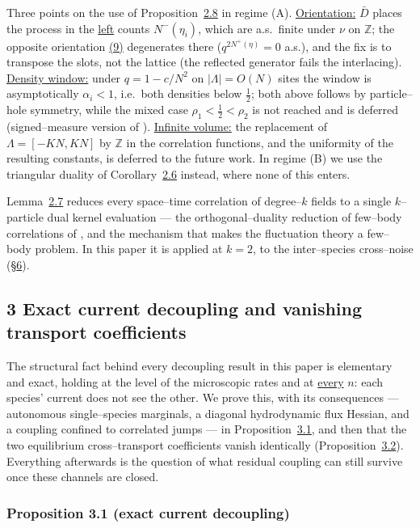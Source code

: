 \documentclass[11pt]{article}
\theoremstyle{plain}
\theoremstyle{definition}
\theoremstyle{remark}
\newcommand{\Z}{\mathbb{Z}}\newcommand{\R}{\mathbb{R}}\newcommand{\N}{\mathbb{N}}
\begin{document}
Three points on the use of Proposition~\hyperref[prop_orth]{2.8} in regime (A). \underline{Orientation:}
$\bar D$ places the process in the \underline{left} counts $N^-(\eta_i)$, which are a.s.\
finite under $\nu$ on $\Z$; the opposite orientation \hyperref[eq_Dreu]{(9)} degenerates there
($q^{2N^+(\eta)}=0$ a.s.), and the fix is to transpose the slots, not the lattice (the
reflected generator fails the interlacing). \underline{Density window:} under $q=1-c/N^2$ on
$|\Lambda|=O(N)$ sites the window is asymptotically $\alpha_i<1$, i.e.\ both densities
below $\tfrac12$; both above follows by particle--hole symmetry, while the mixed case
$\rho_1<\tfrac12<\rho_2$ is not reached and is deferred (signed--measure version of
\cite[Thm.~3.2]{CFG20}). \underline{Infinite volume:} the replacement of $\Lambda=[-KN,KN]$
by $\Z$ in the correlation functions, and the uniformity of the resulting constants,
is deferred to the future work. In regime (B) we use the triangular duality of
Corollary~\hyperref[cor_tri]{2.6} instead, where none of this enters.
\par

\noindent Lemma~\hyperref[lem_acr]{2.7} reduces every space--time correlation of degree--$k$
fields to a single $k$--particle dual kernel evaluation --- the orthogonal--duality
reduction of few--body correlations of \cite{ACR,ACR2}, and the mechanism that makes the
fluctuation theory a few--body problem. In this paper it is applied at $k=2$, to the
inter--species cross--noise (\S\hyperref[sec_ew]{6}).

\subsection{3 Exact current decoupling and vanishing transport coefficients}\label{sec_decouple}

The structural fact behind every decoupling result in this paper is elementary and
exact, holding at the level of the microscopic rates and at \underline{every} $n$: each
species' current does not see the other. We prove this, with its consequences ---
autonomous single--species marginals, a diagonal hydrodynamic flux Hessian, and a
coupling confined to correlated jumps --- in Proposition~\hyperref[prop_decouple]{3.1}, and then
that the two equilibrium cross--transport coefficients vanish identically
(Proposition~\hyperref[prop_cross]{3.2}). Everything afterwards is the question of what residual
coupling can still survive once these channels are closed.

\subsubsection{Proposition 3.1 (exact current decoupling)}\label{prop_decouple}
\end{document}
